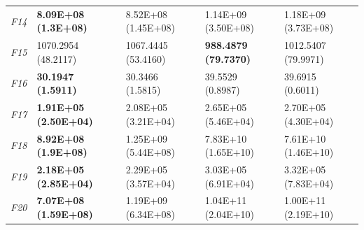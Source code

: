 \begin{table}[!h]
\begin{center}
\begin{tabular}{p{0.5cm}|p{2.5cm}|p{2.5cm}|p{2.5cm}|p{2.5cm}}
\textit{F14} & \textbf{8.09E+08 (1.3E+08)} & 8.52E+08 (1.45E+08) & 1.14E+09 (3.50E+08) & 1.18E+09 (3.73E+08)\\
\textit{F15} & 1070.2954 (48.2117) & 1067.4445 (53.4160) & \textbf{988.4879 (79.7370)} & 1012.5407 (79.9971)\\
\textit{F16} & \textbf{30.1947 (1.5911)} & 30.3466 (1.5815) & 39.5529 (0.8987) & 39.6915 (0.6011)\\
\textit{F17} & \textbf{1.91E+05 (2.50E+04)} & 2.08E+05 (3.21E+04) & 2.65E+05 (5.46E+04) & 2.70E+05 (4.30E+04)\\
\textit{F18} & \textbf{8.92E+08 (1.9E+08)} & 1.25E+09 (5.44E+08) & 7.83E+10 (1.65E+10) & 7.61E+10 (1.46E+10)\\
\textit{F19} & \textbf{2.18E+05 (2.85E+04)} & 2.29E+05 (3.57E+04) & 3.03E+05 (6.91E+04) & 3.32E+05 (7.83E+04)\\
\textit{F20} & \textbf{7.07E+08 (1.59E+08)} & 1.19E+09 (6.34E+08) & 1.04E+11 (2.04E+10) & 1.00E+11 (2.19E+10)\\
\hline
\end{tabular}
\end{center}
\end{table}

